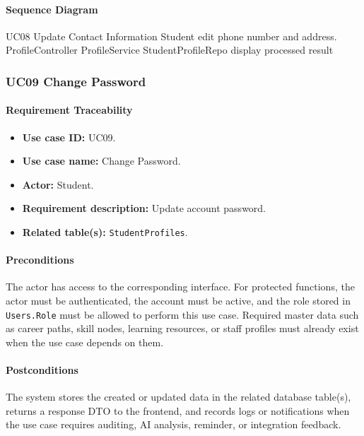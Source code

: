 \paragraph{Sequence Diagram}

\SequenceDiagram
{UC08 Update Contact Information}
{Student}
{edit phone number and address.}
{ProfileController}
{ProfileService}
{StudentProfileRepo}
{display processed result}

\subsubsection{UC09 Change Password}

\paragraph{Requirement Traceability}

\begin{itemize}
    \item \textbf{Use case ID:} UC09.
    \item \textbf{Use case name:} Change Password.
    \item \textbf{Actor:} Student.
    \item \textbf{Requirement description:} Update account password.
    \item \textbf{Related table(s):} \texttt{StudentProfiles}.
\end{itemize}

\paragraph{Preconditions}

The actor has access to the corresponding interface. For protected functions, the actor must be authenticated, the account must be active, and the role stored in \texttt{Users.Role} must be allowed to perform this use case. Required master data such as career paths, skill nodes, learning resources, or staff profiles must already exist when the use case depends on them.

\paragraph{Postconditions}

The system stores the created or updated data in the related database table(s), returns a response DTO to the frontend, and records logs or notifications when the use case requires auditing, AI analysis, reminder, or integration feedback.


